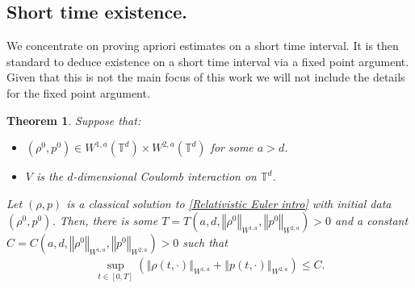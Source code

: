 \documentclass[11pt,reqno]{amsart}
\newtheorem{thm}{Theorem}[section]
\numberwithin{equation}{section}
\begin{document}
\subsection{Short time existence.} 
We concentrate on proving apriori estimates on a short time interval. It is then standard to deduce existence on a short time interval via a fixed point argument. Given that this is not the main focus of this work we will not include the details for the fixed point argument. 
\begin{thm}
Suppose that: 
\begin{itemize}
    \item $(\rho^{0},p^{0})\in W^{1,a}(\mathbb{T}^{d})\times W^{2,a}(\mathbb{T}^{d})$ for some $a>d$. 
    \item $V$ is the $d$-dimensional Coulomb interaction on $\mathbb{T}^{d}$.
\end{itemize}
Let $(\rho,p)$ is a classical solution to \eqref{Relativistic Euler intro} with initial data $(\rho^
{0},p^{0})$. Then, there is some $T=T(a,d,\left\Vert \rho^{0}\right\Vert_{W^{1,a}},\left\Vert p^{0}\right\Vert_{W^{2,a}})>0$ and a constant $C=C(a,d,\left\Vert \rho^{0}\right\Vert_{W^{1,a}},\left\Vert p^{0}\right\Vert_{W^{2,a}})>0$ such that 
\begin{align*}
\underset{t\in [0,T]}{\sup}(\left\Vert \rho(t,\cdot)\right\Vert_{W^{1,a}}+\left\Vert p(t,\cdot)\right\Vert_{W^{2,a}})\leq  C.      
\end{align*}
\label{short time well posedness}
\end{thm}
\end{document}
